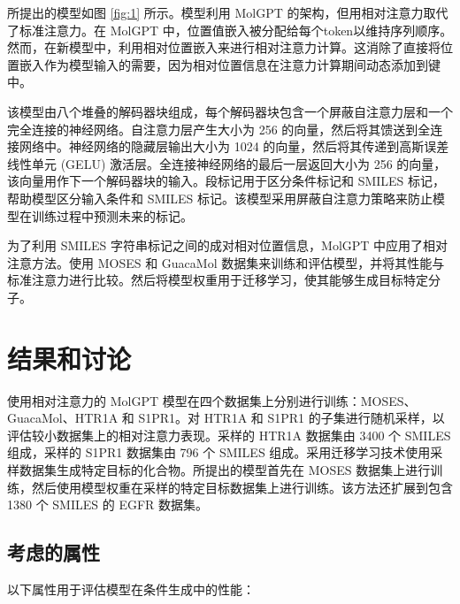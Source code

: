 \begin{translation}
所提出的模型如图 \ref{fig:1} 所示。模型利用 MolGPT 的架构，但用相对注意力取代了标准注意力。在 MolGPT 中，位置值嵌入被分配给每个token以维持序列顺序。然而，在新模型中，利用相对位置嵌入来进行相对注意力计算。这消除了直接将位置嵌入作为模型输入的需要，因为相对位置信息在注意力计算期间动态添加到键中。

该模型由八个堆叠的解码器块组成，每个解码器块包含一个屏蔽自注意力层和一个完全连接的神经网络。自注意力层产生大小为 256 的向量，然后将其馈送到全连接网络中。神经网络的隐藏层输出大小为 1024 的向量，然后将其传递到高斯误差线性单元 (GELU) 激活层。全连接神经网络的最后一层返回大小为 256 的向量，该向量用作下一个解码器块的输入。段标记用于区分条件标记和 SMILES 标记，帮助模型区分输入条件和 SMILES 标记。该模型采用屏蔽自注意力策略来防止模型在训练过程中预测未来的标记。

为了利用 SMILES 字符串标记之间的成对相对位置信息，MolGPT 中应用了相对注意方法。使用 MOSES 和 GuacaMol 数据集来训练和评估模型，并将其性能与标准注意力进行比较。然后将模型权重用于迁移学习，使其能够生成目标特定分子。

\section{结果和讨论}

使用相对注意力的 MolGPT 模型在四个数据集上分别进行训练：MOSES、GuacaMol、HTR1A 和 S1PR1。对 HTR1A 和 S1PR1 的子集进行随机采样，以评估较小数据集上的相对注意力表现。采样的 HTR1A 数据集由 3400 个 SMILES 组成，采样的 S1PR1 数据集由 796 个 SMILES 组成。采用迁移学习技术使用采样数据集生成特定目标的化合物。所提出的模型首先在 MOSES 数据集上进行训练，然后使用模型权重在采样的特定目标数据集上进行训练。该方法还扩展到包含 1380 个 SMILES 的 EGFR 数据集。

\subsection{考虑的属性}

以下属性用于评估模型在条件生成中的性能：


\end{translation}
